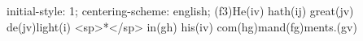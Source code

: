 initial-style: 1;
centering-scheme: english;
(f3)He(iv) hath(ij) great(jv) de(jv)light(i) <sp>*</sp> in(gh) his(iv) com(hg)mand(fg)ments.(gv)
